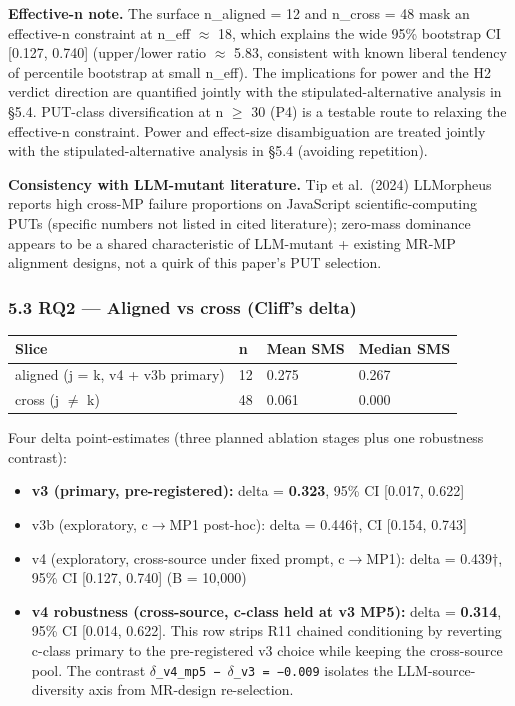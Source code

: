 \documentclass[review,12pt,authoryear]{elsarticle}
\providecommand{\tightlist}{\setlength{\itemsep}{0pt}\setlength{\parskip}{0pt}}
\newcounter{none}                   %
\begin{document}
\textbf{Effective-n note.} The surface n\_aligned = 12 and n\_cross = 48
mask an effective-n constraint at n\_eff $\approx$ 18, which explains the wide
95\% bootstrap CI {[}0.127, 0.740{]} (upper/lower ratio $\approx$ 5.83,
consistent with known liberal tendency of percentile bootstrap at small
n\_eff). The implications for power and the H2 verdict direction are
quantified jointly with the stipulated-alternative analysis in §5.4.
PUT-class diversification at n $\geq$ 30 (P4) is a testable route to relaxing
the effective-n constraint. Power and effect-size disambiguation are
treated jointly with the stipulated-alternative analysis in §5.4
(avoiding repetition).

\textbf{Consistency with LLM-mutant literature.} Tip et al.~(2024)
LLMorpheus reports high cross-MP failure proportions on JavaScript
scientific-computing PUTs (specific numbers not listed in cited
literature); zero-mass dominance appears to be a shared characteristic
of LLM-mutant + existing MR-MP alignment designs, not a quirk of this
paper's PUT selection.

\subsubsection{5.3 RQ2 --- Aligned vs cross (Cliff's
delta)}\label{rq2-aligned-vs-cross-cliffs-delta}

{\def\LTcaptype{none} %
\begin{longtable}[]{@{}llll@{}}
\toprule\noalign{}
Slice & n & Mean SMS & Median SMS \\
\midrule\noalign{}
\endhead
\bottomrule\noalign{}
\endlastfoot
aligned (j = k, v4 + v3b primary) & 12 & 0.275 & 0.267 \\
cross (j $\neq$ k) & 48 & 0.061 & 0.000 \\
\end{longtable}
}

Four delta point-estimates (three planned ablation stages plus one
robustness contrast):

\begin{itemize}
\tightlist
\item
  \textbf{v3 (primary, pre-registered):} delta = \textbf{0.323}, 95\% CI
  {[}0.017, 0.622{]}
\item
  v3b (exploratory, c$\to$MP1 post-hoc): delta = 0.446†, CI {[}0.154,
  0.743{]}
\item
  v4 (exploratory, cross-source under fixed prompt, c$\to$MP1): delta =
  0.439†, 95\% CI {[}0.127, 0.740{]} (B = 10,000)
\item
  \textbf{v4 robustness (cross-source, c-class held at v3 MP5):} delta =
  \textbf{0.314}, 95\% CI {[}0.014, 0.622{]}. This row strips R11
  chained conditioning by reverting c-class primary to the
  pre-registered v3 choice while keeping the cross-source pool. The
  contrast \texttt{$\delta$\_v4\_mp5\ −\ $\delta$\_v3\ =\ −0.009} isolates the
  LLM-source-diversity axis from MR-design re-selection.
\end{itemize}
\end{document}
